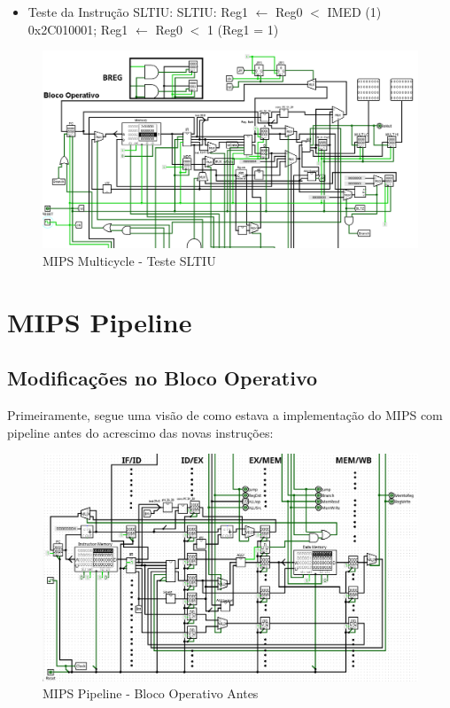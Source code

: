 \documentclass{report}
\let\oldsection\section
\renewcommand\section{\clearpage\oldsection}
\begin{document}
        \clearpage
        \begin{itemize}
            \item Teste da Instrução SLTIU:
                \subitem SLTIU: Reg1 $\leftarrow$ Reg0 $<$ IMED (1)
                \subitem 0x2C010001; Reg1 $\leftarrow$ Reg0 $<$ 1 (Reg1 = 1)
        \end{itemize}

        \begin{figure}[h!]
            \centering
            \includegraphics[width=\linewidth]{images/prints/Multicycle/Teste SLTIU.png}
            \caption{\label{print:multicycle_test_SLTIU} MIPS Multicycle - Teste SLTIU}
        \end{figure}





    \section{MIPS Pipeline}
        \subsection{Modificações no Bloco Operativo}
        Primeiramente, segue uma visão de como estava a implementação do MIPS com pipeline antes
        do acrescimo das novas instruções:
        \begin{figure}[h!]
            \centering
            \includegraphics[width=\linewidth]{images/prints/Pipeline/Bloco Operativo Pipeline Antes.png}
            \caption{\label{print:pipeline_ob_before} MIPS Pipeline - Bloco Operativo Antes}
        \end{figure}
\end{document}
